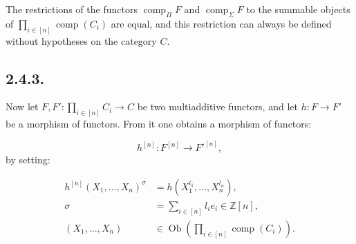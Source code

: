 The restrictions of the functors $\operatorname{comp}_{\Pi}F$ and
$\operatorname{comp}_{\Sigma}F$ to the summable objects of
$\prod_{i\in[n]}\operatorname{comp}(C_i)$ are equal, and this restriction
can always be defined without hypotheses on the category $C$.

\subsection*{2.4.3.}
Now let
$F,F'\colon\prod_{i\in[n]}C_i\longrightarrow C$ be two multiadditive
functors, and let $h\colon F\longrightarrow F'$ be a morphism of functors.
From it one obtains a morphism of functors:

\begin{equation*}
  h^{[n]}\colon F^{[n]}\longrightarrow F'^{[n]},
\end{equation*}
by setting:

\begin{equation}
  \begin{aligned}
    h^{[n]}(X_1,\ldots,X_n)^{\sigma}
      &=h(X_1^{l_1},\ldots,X_n^{l_n}),\\
    \sigma&=\sum_{i\in[n]}l_i e_i\in\mathbb Z[n],\\
    (X_1,\ldots,X_n)&\in
      \operatorname{Ob}\!\left(\prod_{i\in[n]}\operatorname{comp}(C_i)\right).
  \end{aligned}
  \tag{2.4.3.1}
\end{equation}
